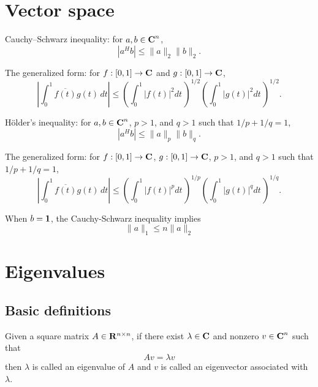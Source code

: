 \section{Vector space}

Cauchy–Schwarz inequality: for $a,b\in{\mbox{\bf C}}^n$,
\begin{equation}
|a^H b| \leq \|a\|_2 \|b\|_2.
\end{equation}

The generalized form:
for $f:[0,1] \to {\mbox{\bf C}}$ and $g:[0,1] \to {\mbox{\bf C}}$,
\begin{equation}
\left|\int_{0}^1 \overline{f(t)} g(t) \, dt \right|
\leq
\left(\int_0^1 |f(t)|^2 dt \, \right)^{1/2}
\left(\int_0^1 |g(t)|^2 dt \, \right)^{1/2}.
\end{equation}

H\"older's inequality: for $a,b\in{\mbox{\bf C}}^n$, $p>1$, and $q>1$ such that $1/p+1/q=1$,
\begin{equation}
|a^H b| \leq \|a\|_p \|b\|_q.
\end{equation}

The generalized form:
for $f:[0,1] \to {\mbox{\bf C}}$, $g:[0,1] \to {\mbox{\bf C}}$,
$p>1$, and $q>1$ such that $1/p+1/q=1$,
\begin{equation}
\left|\int_{0}^1 \overline{f(t)} g(t) \, dt \right|
\leq
\left(\int_0^1 |f(t)|^p dt \, \right)^{1/p}
\left(\int_0^1 |g(t)|^q dt \, \right)^{1/q}.
\end{equation}

When $b=\mathbf 1$, the Cauchy-Schwarz inequality implies
\begin{equation}
\|a\|_1 \leq n \|a\|_2
\end{equation}



\section{Eigenvalues}

\subsection{Basic definitions}

Given a square matrix $A\in\mathbf{R}^{n\times n}$,
if there exist $\lambda \in {\mbox{\bf C}}$ and nonzero $v \in {\mbox{\bf C}}^n$ such that
\begin{equation}
        A v = \lambda v
\end{equation}
then $\lambda$ is called an eigenvalue of $A$ and $v$ is called an eigenvector associated with $\lambda$.

